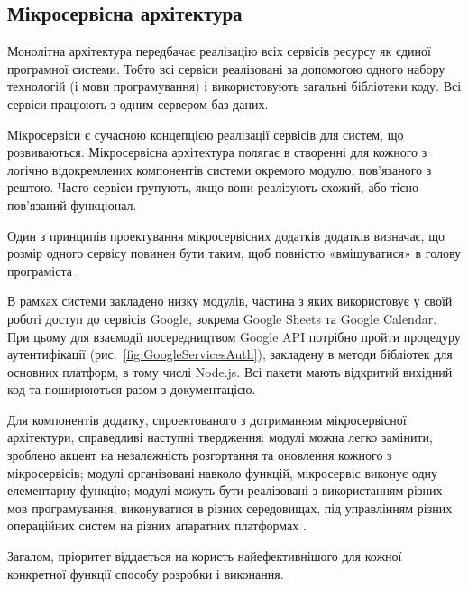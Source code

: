 \subsection{Мікросервісна архітектура}

Монолітна архітектура передбачає реалізацію всіх сервісів ресурсу як єдиної програмної системи. Тобто всі сервіси реалізовані за допомогою одного набору технологій (і мови програмування) і використовують загальні бібліотеки коду. Всі сервіси працюють з одним сервером баз даних.

Мікросервіси є сучасною концепцією реалізації сервісів для систем, що розвиваються. Мікросервісна архітектура полягає в створенні для кожного з логічно відокремлених компонентів системи окремого модулю, пов'язаного з рештою. Часто сервіси групують, якщо вони реалізують схожий, або тісно пов'язаний функціонал.  

Один з принципів проектування мікросервісних додатків додатків визначає, що розмір одного сервісу повинен бути таким, щоб повністю «вміщуватися» в голову програміста \cite{приходченко2018обґрунтування}.

В рамках системи закладено низку модулів, частина з яких використовує у своїй роботі доступ до сервісів Google, зокрема Google Sheets та Google Calendar. При цьому для взаємодії посередництвом Google API потрібно пройти процедуру аутентифікації (рис.~\ref{fig:GoogleServicesAuth}), закладену в методи бібліотек для основних платформ, в тому числі Node.js. Всі пакети мають відкритий вихідний код та поширюються разом з документацією.


Для компонентів додатку, спроектованого з дотриманням мікросервісної архітектури, справедливі наступні твердження: модулі можна легко замінити, зроблено акцент на незалежність розгортання та оновлення кожного з мікросервісів; модулі організовані навколо функцій, мікросервіс виконує одну елементарну функцію; модулі можуть бути реалізовані з використанням різних мов програмування, виконуватися в різних середовищах, під управлінням різних операційних систем на різних апаратних платформах \cite[159]{кучер2018мікросервісна}.

Загалом, пріоритет віддається на користь найефективнішого для кожної конкретної функції способу розробки і виконання.
